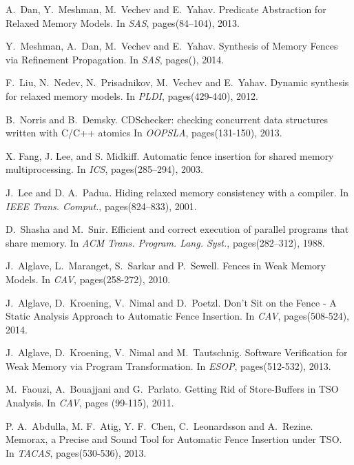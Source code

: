 \documentclass[preprint,9pt]{sigplanconf}
\begin{document}
\begin{thebibliography}{10}
{
A.~Dan, Y.~Meshman, M.~Vechev and E.~Yahav.
\newblock Predicate Abstraction for Relaxed Memory Models. 
\newblock In {\em SAS}, pages(84–104), 2013.

Y.~Meshman, A.~Dan, M.~Vechev and E.~Yahav.
\newblock Synthesis of Memory Fences via Refinement Propagation.
\newblock In {\em SAS}, pages(), 2014.

F.~Liu, N.~Nedev, N.~Prisadnikov, M.~Vechev and E.~Yahav.
\newblock Dynamic synthesis for relaxed memory models. 
\newblock In {\em PLDI}, pages(429-440), 2012.

B.~Norris and B.~Demsky.
\newblock CDSchecker: checking concurrent data structures written with C/C++ atomics
\newblock In {\em OOPSLA}, pages(131-150), 2013.

X. Fang, J. Lee, and S. Midkiff.
\newblock Automatic fence insertion for shared memory multiprocessing.
\newblock In {\em ICS}, pages(285–294), 2003.

J.~Lee and D. A.~Padua.
\newblock Hiding relaxed memory consistency with a compiler.
\newblock In {\em IEEE Trans. Comput.}, pages(824–833), 2001.

D.~Shasha and M.~Snir.
\newblock Efficient and correct execution of parallel programs that share memory.
\newblock In {\em ACM Trans. Program. Lang. Syst.}, pages(282–312), 1988.

J.~Alglave, L.~Maranget, S.~Sarkar and P.~Sewell. 
\newblock Fences in Weak Memory Models.
\newblock In {\em CAV}, pages(258-272), 2010.

J.~Alglave, D.~Kroening, V.~Nimal and D.~Poetzl. 
\newblock  Don't Sit on the Fence - A Static Analysis Approach to Automatic Fence Insertion.
\newblock In {\em CAV}, pages(508-524), 2014.

J.~Alglave, D.~Kroening, V.~Nimal and M.~Tautschnig. 
\newblock   Software Verification for Weak Memory via Program Transformation.
\newblock In {\em ESOP}, pages(512-532), 2013.

M.~Faouzi, A.~Bouajjani and G.~Parlato.
\newblock Getting Rid of Store-Buffers in TSO Analysis.
\newblock In {\em CAV}, pages (99-115), 2011.

P. A.~Abdulla, M. F.~Atig, Y. F.~Chen, C.~Leonardsson and A.~Rezine.
\newblock Memorax, a Precise and Sound Tool for Automatic Fence Insertion under TSO.
\newblock In {\em TACAS}, pages(530-536), 2013.

}
\end{thebibliography}
\end{document}

